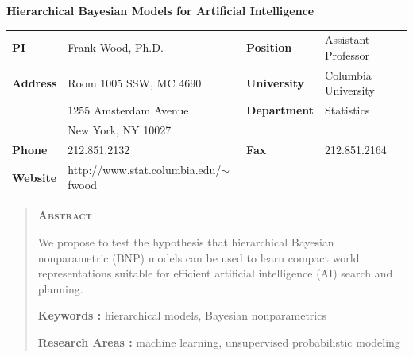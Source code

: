 \documentclass[12pt]{article}
\begin{document}
\begin{center} \bf \Large Hierarchical Bayesian Models for Artificial Intelligence \end{center}
%

%
\begin{center}
\begin{tabular}{llll}
{\bf PI }& Frank Wood, Ph.D. &{\bf Position }& Assistant Professor\\
{\bf Address} & Room 1005 SSW, MC 4690 & {\bf University} & Columbia University \\
&1255 Amsterdam Avenue & {\bf Department }& Statistics \\
&New York, NY 10027 \\
 {\bf Phone} & 212.851.2132& {\bf Fax} & 212.851.2164 \\
 {\bf Website} &{http://www.stat.columbia.edu/$\sim$fwood}\\
\end{tabular}
\end{center}

\begin{quote}
\begin{center}
\bf \scshape Abstract
\end{center}
We propose to test the hypothesis that hierarchical Bayesian nonparametric (BNP) models can be used to learn compact world representations suitable for efficient artificial intelligence (AI) search and planning.  

{\bf Keywords :} hierarchical models, Bayesian nonparametrics

\vspace{-.1cm}
{\bf Research Areas :} machine learning, unsupervised probabilistic modeling
\end{quote}
\end{document}
